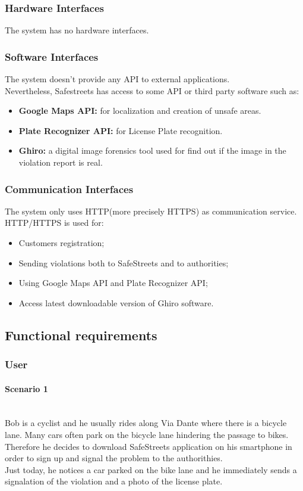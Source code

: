 \documentclass{article}
\begin{document}
\subsubsection{Hardware Interfaces}
The system has no hardware interfaces.
\subsubsection{Software Interfaces}
The system doesn't provide any API to external applications.\\
Nevertheless, Safestreets has access to some API or third party software such as:
\begin{itemize}
    \item \textbf{Google Maps API:} for localization and creation of unsafe areas.
    \item \textbf{Plate Recognizer API:} for License Plate recognition.
    \item \textbf{Ghiro:} a digital image forensics tool used for find out if the image
    in the violation report is real.
\end{itemize}
\subsubsection{Communication Interfaces}
The system only uses HTTP(more precisely HTTPS) as communication service.
HTTP/HTTPS is used for:
\begin{itemize}
    \item Customers registration;
    \item Sending violations both to SafeStreets and to authorities;
    \item Using Google Maps API and Plate Recognizer API;
    \item Access latest downloadable version of Ghiro software.
\end{itemize}

\newpage
\subsection{Functional requirements}
\subsubsection{User}
\paragraph{Scenario 1}\mbox{}\\
Bob is a cyclist and he usually rides along Via Dante where there is a bicycle
lane. Many cars often park on the bicycle lane hindering the passage to bikes.
Therefore he decides to download SafeStreets application on his smartphone in
order to sign up and signal the problem to the authorithies.\\ Just today, he
notices a car parked on the bike lane and he immediately sends a signalation of
the violation and a photo of the license plate.
\end{document}
